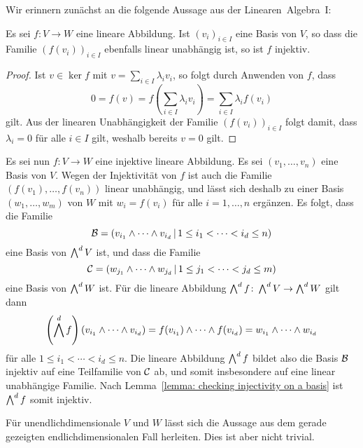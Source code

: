 Wir erinnern zunächst an die folgende Aussage aus der Linearen~Algebra~I:

\begin{lemma}
  \label{lemma: checking injectivity on a basis}
  Es sei $f \colon V \to W$ eine lineare Abbildung.
  Ist $(v_i)_{i \in I}$ eine Basis von $V$, so dass die Familie $(f(v_i))_{i \in I}$ ebenfalls linear unabhängig ist, so ist $f$ injektiv.
\end{lemma}

\begin{proof}
  Ist $v \in \ker f$ mit $v = \sum_{i \in I} \lambda_i v_i$, so folgt durch Anwenden von $f$, dass
  \[
      0
    = f(v)
    = f\left( \sum_{i \in I} \lambda_i v_i \right)
    = \sum_{i \in I} \lambda_i f(v_i)
  \]
  gilt.
  Aus der linearen Unabhängigkeit der Familie $(f(v_i))_{i \in I}$ folgt damit, dass $\lambda_i = 0$ für alle $i \in I$ gilt, weshalb bereits $v = 0$ gilt.
\end{proof}

Es sei nun $f \colon V \to W$ eine injektive lineare Abbildung.
Es sei $(v_1, \dotsc, v_n)$ eine Basis von $V$.
Wegen der Injektivität von $f$ ist auch die Familie $(f(v_1), \dotsc, f(v_n))$ linear unabhängig, und lässt sich deshalb zu einer Basis $(w_1, \dotsc, w_m)$ von $W$ mit $w_i = f(v_i)$ für alle $i = 1, \dotsc, n$ ergänzen.
Es folgt, dass die Familie
\[
    \mathcal{B}
  = (
      v_{i_1} \wedge \dotsb \wedge v_{i_d}
      \,|\,
      1 \leq i_1 < \dotsb < i_d \leq n
    )
\]
eine Basis von $\bigwedge^{d} V$ ist, und dass die Familie
\[
    \mathcal{C}
  = (
      w_{j_1} \wedge \dotsb \wedge w_{j_d}
      \,|\,
      1 \leq j_1 < \dotsb < j_d \leq m
    )
\]
eine Basis von $\bigwedge^{d} W$ ist.
Für die lineare Abbildung $\bigwedge^{d} f \colon \bigwedge^{d} V \to \bigwedge^{d} W$ gilt dann
\[
    \left(\bigwedge^{d} f\right)(v_{i_1} \wedge \dotsb \wedge v_{i_d})
  = f(v_{i_1}) \wedge \dotsb \wedge f(v_{i_d})
  = w_{i_1} \wedge \dotsb \wedge w_{i_d}
\]
für alle $1 \leq i_1 < \dotsb < i_d \leq n$.
Die lineare Abbildung $\bigwedge^{d} f$ bildet also die Basis $\mathcal{B}$ injektiv auf eine Teilfamilie von $\mathcal{C}$ ab, und somit insbesondere auf eine linear unabhängige Familie.
Nach Lemma~\ref{lemma: checking injectivity on a basis} ist $\bigwedge^{d} f$ somit injektiv.

\begin{remark}
  Für unendlichdimensionale $V$ und $W$ lässt sich die Aussage aus dem gerade gezeigten endlichdimensionalen Fall herleiten.
  Dies ist aber nicht trivial.
\end{remark}





